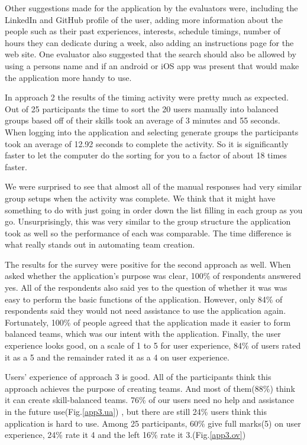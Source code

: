 \documentclass[conference]{IEEEtran}
\begin{document}
Other suggestions made for the application by the evaluators were, including the LinkedIn and GitHub profile of the user, adding more information about the people such as their past experiences, interests, schedule timings, number of hours they can dedicate during a week, also adding an instructions page for the web site. One evaluator also suggested that the search should also be allowed by using a persons name and if an android or iOS app was present that would make the application more handy to use.

In approach 2 the results of the timing activity were pretty much as expected. Out of 25 participants the time to sort the 20 users manually into balanced groups based off of their skills took an average of 3 minutes and 55 seconds. When logging into the application and selecting generate groups the participants took an average of 12.92 seconds to complete the activity. So it is significantly faster to let the computer do the sorting for you to a factor of about 18 times faster. 

We were surprised to see that almost all of the manual responses had very similar group setups when the activity was complete. We think that it might have something to do with just going in order down the list filling in each group as you go. Unsurprisingly, this was very similar to the group structure the application took as well so the performance of each was comparable. The time difference is what really stands out in automating team creation.

The results for the survey were positive for the second approach as well. When asked whether the application's purpose was clear, 100\% of respondents answered yes. All of the respondents also said yes to the question of whether it was was easy to perform the basic functions of the application. However, only 84\% of respondents said they would not need assistance to use the application again. Fortunately, 100\% of people agreed that the application made it easier to form balanced teams, which was our intent with the application. Finally, the user experience looks good, on a scale of 1 to 5 for user experience, 84\% of users rated it as a 5 and the remainder rated it as a 4 on user experience. 

Users' experience of approach 3 is good. All of the participants think this approach achieves the purpose of creating teams. And most of them(88\%) think it can create skill-balanced teams. 76\% of our users need no help and assistance in the future use(Fig.\ref{app3.ua}) , but there are still 24\% users think this application is hard to use. Among 25 participants, 60\% give full marks(5) on user experience, 24\% rate it 4 and the left 16\% rate it 3.(Fig.\ref{app3.ov}) 
\end{document}
